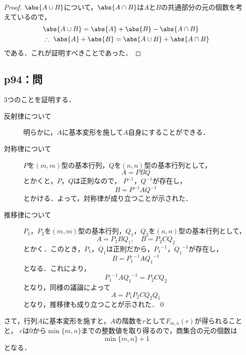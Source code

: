 \documentclass[uplatex,dvipdfmx,a4paper,10pt,fleqn]{jsarticle}
\begin{document}
\begin{leftbar}
    \begin{proof} 
        $\abs{A \cup B}$について，$ \abs{A \cap B}$は$A$と$B$の共通部分の元の個数を考えているので，
        \begin{align*} 
            & \abs{A \cup B} = \abs{A}+\abs{B} - \abs{A \cap B} \\
            & \therefore ~ \abs{A}+\abs{B} = \abs{A \cup B} + \abs{A \cap B}
        \end{align*} 
        である．これが証明すべきことであった．
    \end{proof}
    \end{leftbar}

    \newpage 


\subsection*{p94：問}

\begin{tleftbar}
    3つのことを証明する．
    \begin{description}
    \item [反射律について] 明らかに，$A$に基本変形を施して$A$自身にすることができる．
    \item [対称律について] $P$を$(m,m)$型の基本行列，$Q$を$(n,n)$型の基本行列として，
    \[
      A = P B Q
    \]
    とかくと，$P$，$Q$は正則なので， $P^{-1}$，$Q^{-1}$が存在し，
    \[
      B= P^{-1} A Q^{-1}
    \]
    とかける．よって，対称律が成り立つことが示された．
    \item[推移律について] $P_1$，$P_2$を$(m,m)$型の基本行列，$Q_1$，$Q_2$を$(n,n)$型の基本行列として，
    \[
      A = P_1 B Q_1 , \quad B = P_2 C Q_2
    \]
    とかく．このとき，$P_1$，$Q_1$は正則だから，${P_1}^{-1}$，${Q_1}^{-1}$が存在し，
    \[
      B = {P_1}^{-1} A {Q_1}^{-1}
    \]
    となる．これにより，
    \[
      {P_1}^{-1} A {Q_1}^{-1} =P_2 C Q_2
    \]
    となり，同様の議論によって
    \[
      A = P_1 P_2 C Q_2 Q_1
    \]
    となり，推移律も成り立つことが示された．\qed 
  \end{description}
  さて，行列$A$に基本変形を施すと，$A$の階数を$r$として$F_{m,n} (r)$が得られることと，
  $r$は$0$から$\min \{m,n\}$までの整数値を取り得るので，商集合の元の個数は
  \[
    \min \{ m , n \} +1
  \]
  となる．
\end{tleftbar}


\newpage 
\end{document}
